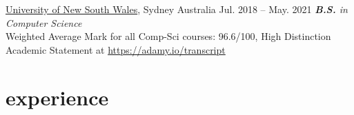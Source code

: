 \documentclass[hidelinks__VERSION__]{adamyi-cv}
\begin{document}
\begin{entrylist}


\entry
{\href{https://unsw.edu.au}{University of New South Wales}, Sydney Australia}
{Jul. 2018 -- May. 2021}
{\emph{\textbf{B.S.} in Computer Science}\\
Weighted Average Mark for all Comp-Sci courses: 96.6/100, High Distinction\\
Academic Statement at \href{https://adamy.io/transcript}{https://adamy.io/transcript}
}

\end{entrylist}


\section{experience}
\end{document}
